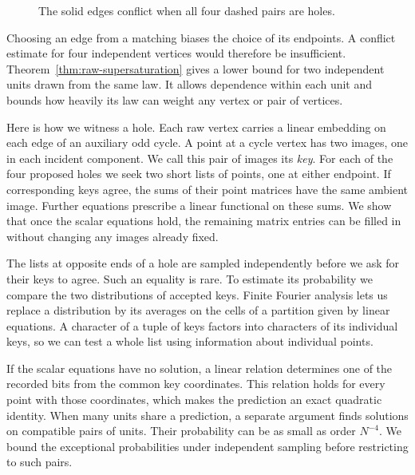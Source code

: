 \begin{figure}[htbp]
\centering
{}
\caption{The solid edges conflict when all four dashed pairs are holes.}
\label{fig:four-holes}
\end{figure}

Choosing an edge from a matching biases the choice of its endpoints.
A conflict estimate for four independent vertices would therefore be
insufficient. Theorem~\ref{thm:raw-supersaturation} gives a lower bound
for two independent units drawn from the same law. It allows dependence
within each unit and bounds how heavily its law can weight any vertex
or pair of vertices.

Here is how we witness a hole. Each raw vertex carries a linear
embedding on each edge of an auxiliary odd cycle. A point at a cycle
vertex has two images, one in each incident component. We call this
pair of images its \emph{key}. For each of the four proposed holes we
seek two short lists of points, one at either endpoint. If corresponding
keys agree, the sums of their point matrices have the same ambient
image. Further equations prescribe a linear functional on these sums.
We show that once the scalar equations hold, the remaining matrix
entries can be filled in without changing any images already fixed.

The lists at opposite ends of a hole are sampled independently before
we ask for their keys to agree. Such an equality is rare. To estimate
its probability we compare the two distributions of accepted keys.
Finite Fourier analysis lets us replace a distribution by its averages
on the cells of a partition given by linear equations. A character of
a tuple of keys factors into characters of its individual keys, so we
can test a whole list using information about individual points.

If the scalar equations have no solution, a linear relation determines
one of the recorded bits from the common key coordinates. This relation
holds for every point with those coordinates, which makes the prediction
an exact quadratic identity. When many units share a prediction, a
separate argument finds solutions on compatible pairs of units. Their
probability can be as small as order \(N^{-4}\). We bound the exceptional
probabilities under independent sampling before restricting to such pairs.

